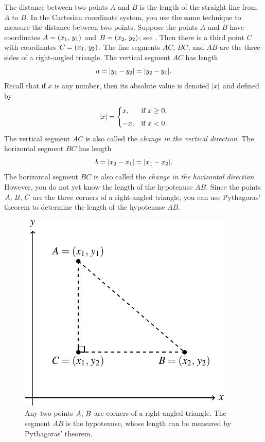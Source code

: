 \documentclass[a4paper,oneside,12pt]{article}
\begin{document}
The distance between two points $A$ and $B$ is the length of the
straight line from $A$ to $B$.  In the Cartesian coordinate system,
you use the same technique to measure the distance between two
points.  Suppose the points $A$ and $B$ have coordinates
$A = \left\lparen{x_1},\, {y_1}\right\rparen$ and $B = \left\lparen{x_2},\, {y_2}\right\rparen$; see
.  Then there is a third point
$C$ with coordinates $C = \left\lparen{x_1},\, {y_2}\right\rparen$.  The line segments $AC$,
$BC$, and $AB$ are the three sides of a right-angled triangle.  The
vertical segment $AC$ has length
\[
a
=
\lvert y_1 - y_2\rvert
=
\lvert y_2 - y_1\rvert.
\]
Recall that if $x$ is any number, then its absolute value is denoted
$\lvert x\rvert$ and defined by
\[
\lvert x\rvert
=
\begin{cases}
x, & \text{if $x \geq 0$}, \\[4pt]
-x, & \text{if $x < 0$}.
\end{cases}
\]
The vertical segment $AC$ is also called the
\emph{change in the vertical direction}.  The horizontal segment $BC$
has length
\[
b
=
\lvert x_2 - x_1\rvert
=
\lvert x_1 - x_2\rvert.
\]
The horizontal segment $BC$ is also called the
\emph{change in the horizontal direction}.  However, you do not yet
know the length of the hypotenuse $AB$.  Since the points
${A},\, {B},\, {C}$ are the three corners of a right-angled triangle,
you can use Pythagoras' theorem to determine the length of the
hypotenuse $AB$.

\begin{figure}[!htbp]
\centering
\includegraphics[scale=1.1]{image/03/distance-two-points.pdf}
\caption{%
  Any two points ${A},\, {B}$ are corners of a right-angled triangle.
  The segment $AB$ is the hypotenuse, whose length can be measured by
  Pythagoras' theorem.
}
\label{fig:distance_between_two_points}
\end{figure}
\end{document}
